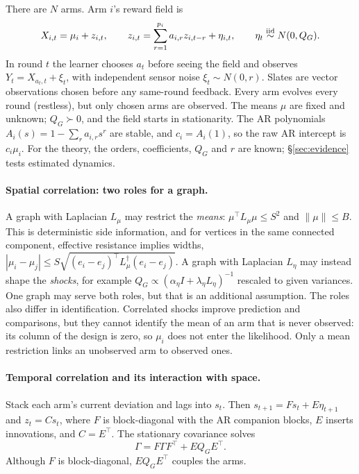 \documentclass[sigconf,review,anonymous]{acmart}
\begin{document}
There are $N$ arms. Arm $i$'s reward field is
\begin{equation}\label{eq:model}
X_{i,t}=\mu_i+z_{i,t},\qquad z_{i,t}=\sum_{r=1}^{p_i}a_{i,r}z_{i,t-r}+\eta_{i,t},\qquad \eta_t\stackrel{\rm iid}{\sim}N(0,Q_G).
\end{equation}
In round $t$ the learner chooses $a_t$ before seeing the field and observes $Y_t=X_{a_t,t}+\xi_t$, with independent sensor noise $\xi_t\sim N(0,r)$. Slates are vector observations chosen before any same-round feedback. Every arm evolves every round (restless), but only chosen arms are observed. The means $\mu$ are fixed and unknown; $Q_G\succ0$, and the field starts in stationarity. The AR polynomials $A_i(s)=1-\sum_ra_{i,r}s^r$ are stable, and $c_i=A_i(1)$, so the raw AR intercept is $c_i\mu_i$. For the theory, the orders, coefficients, $Q_G$ and $r$ are known; \S\ref{sec:evidence} tests estimated dynamics.

\paragraph{Spatial correlation: two roles for a graph.} A graph with Laplacian $L_\mu$ may restrict the \emph{means}: $\mu^\top L_\mu\mu\le S^2$ and $\|\mu\|\le B$. This is deterministic side information, and for vertices in the same connected component, effective resistance implies widths, $|\mu_i-\mu_j|\le S\sqrt{(e_i-e_j)^\top L_\mu^\dagger(e_i-e_j)}$. A graph with Laplacian $L_\eta$ may instead shape the \emph{shocks}, for example $Q_G\propto(\alpha_\eta I+\lambda_\eta L_\eta)^{-1}$ rescaled to given variances. One graph may serve both roles, but that is an additional assumption. The roles also differ in identification. Correlated shocks improve prediction and comparisons, but they cannot identify the mean of an arm that is never observed: its column of the design is zero, so $\mu_i$ does not enter the likelihood. Only a mean restriction links an unobserved arm to observed ones.

\paragraph{Temporal correlation and its interaction with space.} Stack each arm's current deviation and lags into $s_t$. Then $s_{t+1}=Fs_t+E\eta_{t+1}$ and $z_t=Cs_t$, where $F$ is block-diagonal with the AR companion blocks, $E$ inserts innovations, and $C=E^\top$. The stationary covariance solves
\[\Gamma=F\Gamma F^\top+EQ_GE^\top.\] Although $F$ is block-diagonal, $EQ_GE^\top$ couples the arms.
\end{document}

